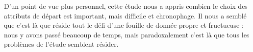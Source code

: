 D'un point de vue plus personnel, cette étude nous a appris combien le choix des attributs de départ est important, mais difficile et chronophage. Il nous a semblé que c'est là que réside tout le défi d'une fouille de donnée propre et fructueuse : nous y avons passé beaucoup de temps, mais paradoxalement c'est là que tous les problèmes de l'étude semblent résider.

